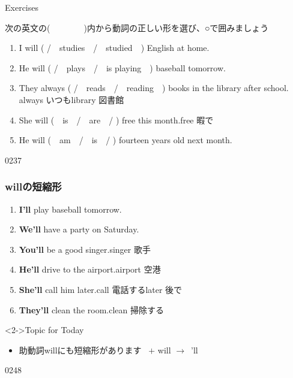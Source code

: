 \documentclass[aspectratio=169,xcolor={dvipsnames,table}]{beamer}
\newcommand{\myaudio}[1]{\href{#1}{\faVolumeUp}}
\begin{document}
\begin{frame}[plain]{Exercises}

{\small 次の英文の(~~~~~~~~)内から動詞の正しい形を選び、○で囲みましょう}

\begin{enumerate}
 \item I will (   /~~studies~~/~~studied~~) English at home.
 \item He will (  /~~plays~~/~~is playing~~) baseball tomorrow.
 \item They always (   /~~reads~~/~~reading~~) books in the library after school.\\
\hfill{\scriptsize always  いつも\hspace{8pt}library  図書館}
 \item She will (~~is~~/~~are~~/  ) free this month.\hfill{\scriptsize free  暇で}
 \item He will (~~am~~/~~is~~/  ) fourteen years old next month.
\end{enumerate}
\mbox{}\hfill{\tiny 0237}\,{\scriptsize \myaudio{./audio/012_will_03.mp3}} 
\end{frame}
\begin{frame}[plain]\frametitle{willの短縮形}

\begin{enumerate}
 \item {\bfseries I'll} play baseball tomorrow.
 \item {\bfseries We'll} have a party on Saturday.
 \item {\bfseries You'll} be a  good singer.\hfill{\scriptsize singer  歌手}
 \item {\bfseries He'll} drive to the airport.\hfill{\scriptsize airport  空港}
 \item {\bfseries She'll} call him later.\hfill{\scriptsize call  電話する\hspace{8pt}later  後で}
 \item {\bfseries They'll} clean the room.\hfill{\scriptsize clean  掃除する}
\end{enumerate}

\vfill

\begin{block}<2->{Topic for Today}
\begin{itemize}[square]\small
 \item  助動詞willにも短縮形があります\
\hfill{} $+$ will $\longrightarrow$ \,'ll\hfill\mbox{}
 \end{itemize}
     \end{block}

\mbox{}\hfill{\tiny 0248}\,{\scriptsize \myaudio{./audio/012_will_03a.mp3}}
\end{frame}
\end{document}
